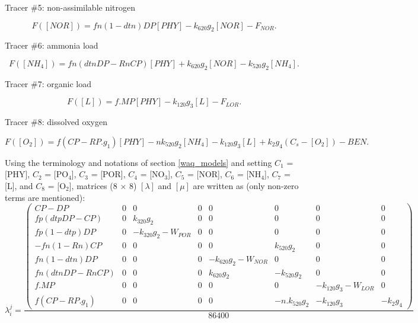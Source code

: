 Tracer $\#$5: non-assimilable nitrogen

\begin{equation}
  F([NOR]) = fn (1- dtn) DP [PHY] - k_{620} g_2 [NOR] - F_{NOR}.
\end{equation}

Tracer $\#$6: ammonia load

\begin{equation}
  F([NH_4]) = fn (dtn DP - Rn CP) [PHY] + k_{620} g_2 [NOR] - k_{520} g_2 [NH_4].
\end{equation}

Tracer $\#$7: organic load

\begin{equation}
  F([L]) = f.MP [PHY] - k_{120} g_3 [L] - F_{LOR}.
\end{equation}

Tracer $\#$8: dissolved oxygen

\begin{equation}
  F([O_2]) = f (CP - RP.g_1) [PHY] - n k_{520} g_2 [NH_4] - k_{120} g_3 [L] + k_2 g_4 (C_s - [O_2]) - BEN.
\end{equation}

Using the terminology and notations of section \ref{waq_models} and setting
$C_1$ = [PHY], $C_2$  = [PO$_4$], $C_3$ = [POR], $C_4$ = [NO$_3$], $C_5$ = [NOR],
$C_6$ = [NH$_4$], $C_7$ = [L], and $C_8$ = [O$_2$],
matrices (8 $\times$ 8) $[\lambda]$ and $[\mu]$
are written as (only non-zero terms are mentioned):\\

$$  \lambda_i^j =
  \frac{
  \begin{pmatrix}
    CP-DP               & 0 &            0 & 0 & 0 & 0 & 0 & 0 \\
    fp (dtp DP -CP)     & 0 &  k_{320} g_2  & 0 & 0 & 0 & 0 & 0 \\
    fp (1-dtp) DP       & 0 & -k_{320} g_2 - W_{POR} & 0 & 0 & 0 & 0 & 0 \\
   -fn (1 -Rn) CP       & 0 &        0 & 0 & 0 &  k_{520} g_2 & 0 & 0 \\
    fn (1-dtn) DP       & 0 &        0 & 0 & -k_{620} g_2 - W_{NOR} & 0 & 0 & 0 \\
    fn (dtn DP - Rn CP) & 0 &        0 & 0 &  k_{620} g_2 & -k_{520} g_2 & 0 & 0 \\
    f . MP              & 0 &        0 & 0 & 0 & 0 & -k_{120} g_3 - W_{LOR} & 0 \\
    f (CP - RP .  g_1 ) & 0 &        0 & 0 & 0 & -n.k_{520} g_2 & -k_{120} g_3 & - k_2 g_4
  \end{pmatrix}
  }{86400}
$$

